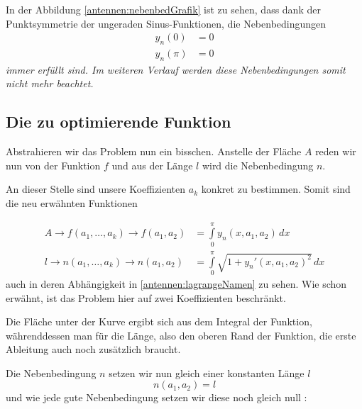 In der Abbildung \ref{antennen:nebenbedGrafik} ist zu sehen, dass dank der Punktsymmetrie 
der ungeraden Sinus-Funktionen, die Nebenbedingungen
\begin{equation}
	\begin{aligned}
		y_n(0)
		&=
		0
		\\
		y_n(\pi)
		&=
		0
	\end{aligned}
\label{antennen:nebenbed3eck}
\end{equation}
\em immer erfüllt \em sind. Im weiteren Verlauf werden diese 
Nebenbedingungen somit nicht mehr beachtet.

\subsection{Die zu optimierende Funktion \label{antennen:optmFunktion}}


Abstrahieren wir das Problem nun ein bisschen. Anstelle der Fläche $A$ reden wir nun von 
der Funktion $f$ und aus der Länge $l$ wird die Nebenbedingung $n$. 

An dieser Stelle sind unsere Koeffizienten $a_k$ konkret zu bestimmen. 
Somit sind die neu erwähnten Funktionen 

\begin{equation}
\begin{aligned}
	A
	\rightarrow
	f(a_1,\ldots,a_k)
	\rightarrow
	f(a_1,a_2)
	&=
	\int\limits_{0}^{\pi} y_n(x,a_1,a_2)\, dx
	\\
	l
	\rightarrow
	n(a_1,\ldots,a_k)
	\rightarrow
	n(a_1,a_2)
	&=
	\int\limits_{0}^{\pi} \sqrt{1+y_n'(x, a_1, a_2)^2}\, dx
\end{aligned}
\label{antennen:lagrangeNamen}
\end{equation}
auch in deren Abhängigkeit in \eqref{antennen:lagrangeNamen} zu sehen. Wie schon erwähnt, 
ist das Problem hier auf zwei Koeffizienten beschränkt. 

Die Fläche unter der Kurve ergibt sich aus dem Integral der Funktion, 
währenddessen man für die Länge, also den oberen Rand der Funktion, die 
erste Ableitung auch noch zusätzlich braucht.

Die Nebenbedingung $n$ setzen wir nun gleich einer konstanten Länge $l$
\begin{equation}
n(a_1, a_2)
=
l
\label{antennen:constNebenbed}
\end{equation}
und wie jede gute Nebenbedingung setzen wir diese noch gleich null :

